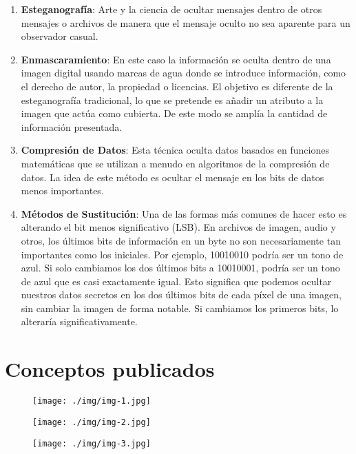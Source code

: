 \documentclass[12pt, a4paper]{article} %
\begin{document}
\begin{enumerate}[resume*]
	\item \textbf{Esteganografía}: Arte y la ciencia de ocultar mensajes dentro de otros mensajes o archivos de manera que el mensaje oculto no sea aparente para un observador casual.
	
	\item \textbf{Enmascaramiento}: En este caso la información se oculta dentro de una imagen digital usando marcas de agua donde se introduce información, como el derecho de autor, la propiedad o licencias. El objetivo es diferente de la esteganografía tradicional, lo que se pretende es añadir un atributo a la imagen que actúa como cubierta. De este modo se amplía la cantidad de información presentada.
	
	\item \textbf{Compresión de Datos}: Esta técnica oculta datos basados en funciones matemáticas que se utilizan a menudo en algoritmos de la compresión de datos. La idea de este método es ocultar el mensaje en los bits de datos menos importantes.
	
	\item \textbf{Métodos de Sustitución}: Una de las formas más comunes de hacer esto es alterando el bit menos significativo (LSB). En archivos de imagen, audio y otros, los últimos bits de información en un byte no son necesariamente tan importantes como los iniciales. Por ejemplo, 10010010 podría ser un tono de azul. Si solo cambiamos los dos últimos bits a 10010001, podría ser un tono de azul que es casi exactamente igual. Esto significa que podemos ocultar nuestros datos secretos en los dos últimos bits de cada píxel de una imagen, sin cambiar la imagen de forma notable. Si cambiamos los primeros bits, lo alteraría significativamente.
\end{enumerate}

\clearpage
\section{Conceptos publicados}

\begin{figure}[h]
	\centering
	\texttt{[image: ./img/img-1.jpg]}
\end{figure}

\begin{figure}[h]
	\centering
	\texttt{[image: ./img/img-2.jpg]}
\end{figure}

\begin{figure}[h]
	\centering
	\texttt{[image: ./img/img-3.jpg]}
\end{figure}
\end{document}
